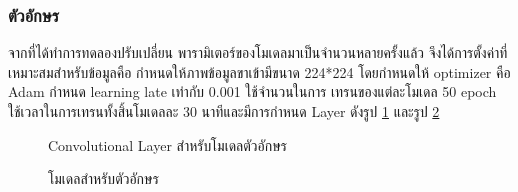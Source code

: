 \documentclass[12pt,oneside,openright,a4paper]{cpe-thai-project}
\begin{document}
\subsubsection{ตัวอักษร}
จากที่ได้ทำการทดลองปรับเปลี่ยน พารามิเตอร์ของโมเดลมาเป็นจำนวนหลายครั้งแล้ว จึงได้การตั้งค่าที่เหมาะสมสำหรับข้อมูลคือ
กำหนดให้ภาพข้อมูลขาเข้ามีขนาด 224*224 โดยกำหนดให้ optimizer คือ Adam กำหนด learning late เท่ากับ 0.001 ใช้จำนวนในการ
เทรนของแต่ละโมเดล 50 epoch ใช้เวลาในการเทรนทั้งสิ้นโมเดลละ 30 นาทีและมีการกำหนด Layer ดังรูป \ref{fig:convalphconf} และรูป \ref{fig:modelalphconf}
\begin{figure}[!ht]\centering
  \setlength{\fboxrule}{0.2mm} %
  \setlength{\fboxsep}{1cm}
  \caption{Convolutional Layer สำหรับโมเดลตัวอักษร}\label{fig:convalphconf}
 \end{figure}
\begin{figure}[!ht]\centering
  \setlength{\fboxrule}{0.2mm} %
  \setlength{\fboxsep}{1cm}
  \caption{โมเดลสำหรับตัวอักษร}\label{fig:modelalphconf}
 \end{figure}
\end{document}
